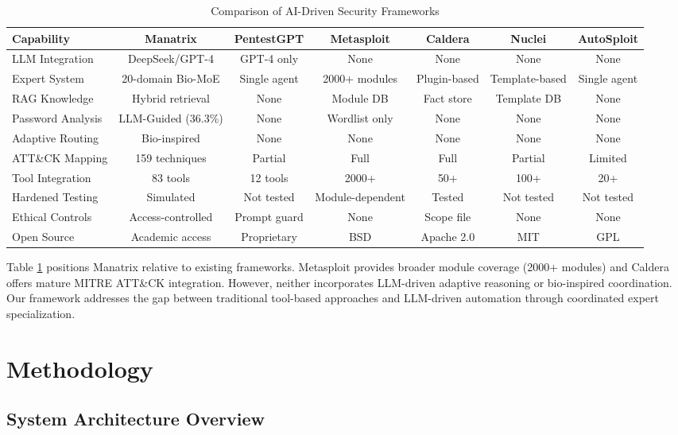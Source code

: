 \documentclass[preprint,12pt]{elsarticle}
\begin{document}
\begin{table}[htbp]
\centering
\caption{Comparison of AI-Driven Security Frameworks}
\label{tab:comparison}
\begin{tabular}{lcccccc}
\toprule
\textbf{Capability} & \textbf{Manatrix} & \textbf{PentestGPT} & \textbf{Metasploit} & \textbf{Caldera} & \textbf{Nuclei} & \textbf{AutoSploit} \\
\midrule
LLM Integration & DeepSeek/GPT-4 & GPT-4 only & None & None & None & None \\
Expert System & 20-domain Bio-MoE & Single agent & 2000+ modules & Plugin-based & Template-based & Single agent \\
RAG Knowledge & Hybrid retrieval & None & Module DB & Fact store & Template DB & None \\
Password Analysis & LLM-Guided (36.3\%) & None & Wordlist only & None & None & None \\
Adaptive Routing & Bio-inspired & None & None & None & None & None \\
ATT\&CK Mapping & 159 techniques & Partial & Full & Full & Partial & Limited \\
Tool Integration & 83 tools & 12 tools & 2000+ & 50+ & 100+ & 20+ \\
Hardened Testing & Simulated & Not tested & Module-dependent & Tested & Not tested & Not tested \\
Ethical Controls & Access-controlled & Prompt guard & None & Scope file & None & None \\
Open Source & Academic access & Proprietary & BSD & Apache 2.0 & MIT & GPL \\
\bottomrule
\end{tabular}
\end{table}

Table \ref{tab:comparison} positions Manatrix relative to existing frameworks. Metasploit provides broader module coverage (2000+ modules) and Caldera offers mature MITRE ATT\&CK integration. However, neither incorporates LLM-driven adaptive reasoning or bio-inspired coordination. Our framework addresses the gap between traditional tool-based approaches and LLM-driven automation through coordinated expert specialization.

\section{Methodology}
\label{sec:methodology}

\subsection{System Architecture Overview}
\end{document}
